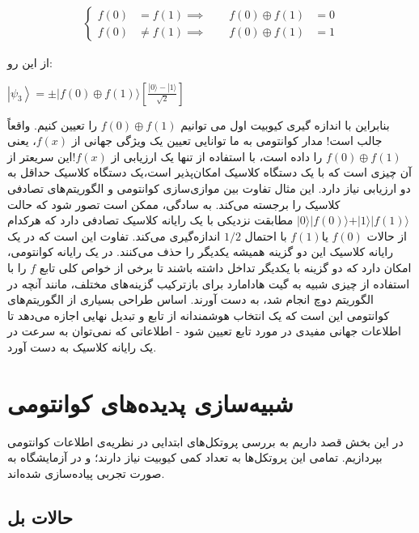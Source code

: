 \documentclass{book}
\begin{document}
$$
\begin{aligned}
	\left\{
	\begin{aligned}
		f(0) &= f(1) 
		\implies \qquad f(0) \oplus f(1) &= 0\\
		f(0) &\neq f(1) 
		\implies \qquad f(0) \oplus f(1) &= 1
	\end{aligned}
	\right.
\end{aligned}$$

از این رو:

\begin{center}
	$\left|\psi_3\right\rangle= \pm|f(0) \oplus f(1)\rangle\left[\frac{|0\rangle-|1\rangle}{\sqrt{2}}\right]$
\end{center}
بنابراین با اندازه گیری کیوبیت اول می توانیم $f(0) \oplus f(1)$ را تعیین کنیم. واقعاً جالب است! مدار کوانتومی به ما توانایی تعیین یک ویژگی جهانی از $f(x)$، یعنی$ f(0)\oplus f(1)$ را داده است، با استفاده از تنها یک ارزیابی از $f(x)$!این سریعتر از آن چیزی است که با یک دستگاه کلاسیک امکان‌پذیر است،یک دستگاه کلاسیک حداقل به دو ارزیابی نیاز دارد.
این مثال تفاوت بین موازی‌سازی کوانتومی و الگوریتم‌های تصادفی کلاسیک را برجسته می‌کند. به سادگی، ممکن است تصور شود که حالت $\vert0\rangle \vert f(0) \rangle + \vert1\rangle \vert f(1) \rangle$ مطابقت نزدیکی با یک رایانه کلاسیک تصادفی دارد که هرکدام از حالات $ f (0)$ یا$ f (1) $ با احتمال $1/2$ اندازه‌گیری می‌کند.
تفاوت این است که در یک رایانه کلاسیک این دو گزینه همیشه یکدیگر را حذف می‌کنند. در یک رایانه کوانتومی، امکان دارد که دو گزینه با یکدیگر تداخل داشته باشند تا برخی از خواص کلی تابع $f$ را با استفاده از چیزی شبیه به گیت هادامارد برای بازترکیب گزینه‌های مختلف، مانند آنچه در الگوریتم دوچ انجام شد، به دست آورند.
اساس طراحی بسیاری از الگوریتم‌های کوانتومی این است که یک انتخاب هوشمندانه از تابع و تبدیل نهایی اجازه می‌دهد تا اطلاعات جهانی مفیدی در مورد تابع تعیین شود - اطلاعاتی که نمی‌توان به سرعت در یک رایانه کلاسیک به دست آورد.



\chapter{شبیه‌سازی پدیده‌های کوانتومی}
در این بخش قصد داریم به بررسی پروتکل‌های ابتدایی در نظریه‌ی اطلاعات کوانتومی بپردازیم. تمامی این پروتکل‌ها به تعداد کمی کیوبیت نیاز دارند؛ و در آزمایشگاه به صورت تجربی پیاده‌سازی شده‌اند. 
\section{حالات بل}
\end{document}
